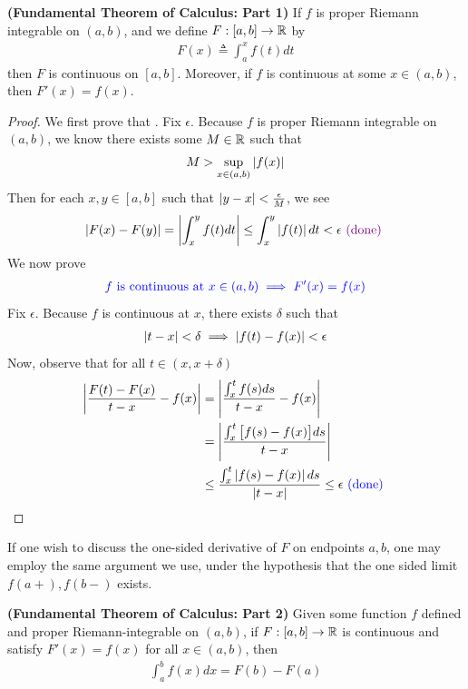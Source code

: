 \documentclass{report}
\begin{document}
\begin{theorem}
  \label{FTC1}
  \textbf{(Fundamental Theorem of Calculus: Part 1)} If $f$ is proper Riemann integrable on $(a,b)$, and we define $F:[a,b]\rightarrow \mathbb{R}$ by 
\begin{align*}
F(x)\triangleq \int_a^x f(t)dt
\end{align*}
then $F$ is continuous on  $[a,b]$. Moreover, if $f$ is continuous at some $x\in (a,b)$, then $F'(x)=f(x)$.
\end{theorem}
\begin{proof}
  We first prove that . Fix $\epsilon $. Because $f$ is proper Riemann integrable on $(a,b)$, we know there exists some $M\in\mathbb{R}$ such that 
 \begin{align*}
M> \sup_{x\in (a,b)}\left|f(x)\right| 
\end{align*}
Then for each $x,y \in [a,b]$ such that $\left|y-x\right|< \frac{\epsilon }{M}$, we see
\begin{align*}
  \left|F(x)-F(y)\right|=\left|\int_x^y f(t)dt\right|\leq \int_x^y \left|f(t)\right|dt<\epsilon \textcolor{violet}{\text{ (done) }}
\end{align*}
We now prove 
\begin{align*}
  \textcolor{blue}{f\text{ is continuous at }x \in (a,b)\implies F'(x)=f(x)}
\end{align*}
Fix $\epsilon $. Because $f$ is continuous at $x$, there exists $\delta $ such that  
\begin{align*}
\left|t-x\right|<\delta \implies \left|f(t)-f(x)\right|<\epsilon 
\end{align*}
Now, observe that for all $t\in (x,x+\delta )$ 
\begin{align*}
\left|\frac{F(t)-F(x)}{t-x}-f(x)\right|&=\left|\frac{\int_{x}^t f(s)ds}{t-x}-f(x)\right|\\                  &=\left|\frac{\int_{x}^t \big[f(s)-f(x) \big]ds}{t-x}\right|\\
&\leq \frac{\int_{x}^t \left|f(s)-f(x)\right|ds}{\left|t-x\right|}\leq \epsilon \textcolor{blue}{\text{ (done) }}
\end{align*}
\end{proof}
\begin{mdframed}
If one wish to discuss the one-sided derivative of $F$ on endpoints $a,b$, one may employ the same argument we use, under the hypothesis that the one sided limit $f(a+),f(b-)$ exists. 
\end{mdframed}
\begin{theorem}
\label{FTC2}
\textbf{(Fundamental Theorem of Calculus: Part 2)} Given some function $f$ defined and proper Riemann-integrable on  $(a,b)$, if $F:[a,b]\rightarrow \mathbb{R}$ is continuous and satisfy $F'(x)=f(x)$  for all $x\in (a,b)$, then 
\begin{align*}
\int_a^b f(x)dx=F(b)-F(a)
\end{align*}
\end{theorem}
\end{document}
